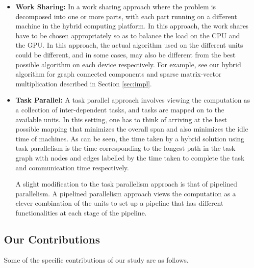 \documentclass[11pt]{article}
\newcommand{\ignore}[1] {}
\newcommand{\spmv} {{\tt spmv}}
\begin{document}
\begin{itemize}
\item {\bf Work Sharing:} In a work sharing approach where the problem is 
decomposed into one or more parts, with each part running on a different 
machine in the hybrid computing platform. In this approach, the work shares
have to be chosen appropriately so as to balance the load on the CPU and the
GPU. In this approach, the actual  algorithm used on the  different units
could be different, and in some  cases, may also be different from the best
possible algorithm on each  device respectively. For example, see our hybrid
algorithm for graph connected components and sparse matrix-vector
multiplication described in Section \ref{sec:impl}.
\ignore{(For instance, consider the \spmv kernel which involves
multiplying a sparse matrix with a vector to produce another vector.
The best hybrid algorithm may actually assign rows that the CPU is
good at working with to the CPU and vice-versa on the GPU. This may
be different from the best possible pure CPU/GPU algorithm which has
to compute on all rows.)}

\item {\bf Task Parallel:}  A task parallel approach involves viewing the 
computation as a collection of inter-dependent tasks, and tasks are 
mapped on to the available units. In this setting, one has to think of
arriving at the best possible mapping that minimizes the overall span and 
also minimizes the idle time of machines. As can be seen, the time taken 
by a hybrid solution using task parallelism is the time corresponding to 
the longest path in the task graph with nodes and edges labelled by the time
taken to complete the task and communication time respectively.

A slight modification to the task parallelism approach is that of pipelined
parallelism.
A pipelined parallelism approach views the computation as a 
clever combination of the units to set up a pipeline that has
different functionalities at each stage of the pipeline. 
\end{itemize}


\subsection{Our Contributions}

Some of the specific contributions of our study are as follows.
\end{document}
